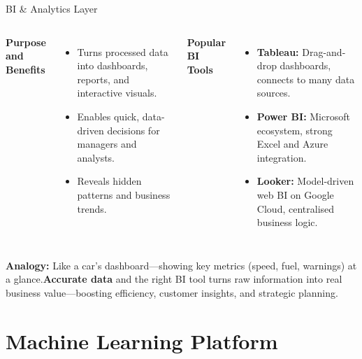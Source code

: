 \documentclass[aspectratio=169, table]{beamer}
\begin{document}
	\begin{frame}[fragile]{BI \& Analytics Layer}
		\vspace{20pt}
		\begin{columns}[T,onlytextwidth]
			\textbf{Purpose and Benefits}
			\begin{itemize}
				\item Turns processed data into dashboards, reports, and interactive visuals.
				\item Enables quick, data-driven decisions for managers and analysts.
				\item Reveals hidden patterns and business trends.
			\end{itemize}
			
			\textbf{Popular BI Tools}
			\begin{itemize}
				\item \textbf{Tableau:} Drag-and-drop dashboards, connects to many data sources.
				\item \textbf{Power BI:} Microsoft ecosystem, strong Excel and Azure integration.
				\item \textbf{Looker:} Model-driven web BI on Google Cloud, centralised business logic.
			\end{itemize}
		\end{columns}
	\vspace{10pt}
	\textbf{Analogy:} Like a car’s dashboard—showing key metrics (speed, fuel, warnings) at a glance.\textbf{Accurate data} and the right BI tool turns raw information into real business value—boosting efficiency, customer insights, and strategic planning.
	
	\end{frame}
	
	\section{Machine Learning Platform}
	
\end{document}
